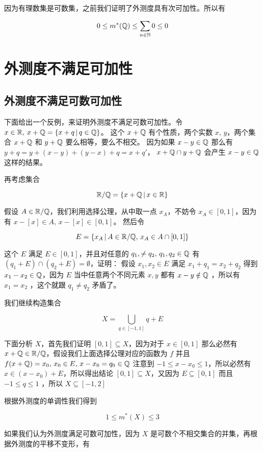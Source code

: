 因为有理数集是可数集，之前我们证明了外测度具有次可加性。所以有

\[
0 \le m^*(\mathbb{Q}) \le \sum_{n \in \mathbb{N}} 0 \le 0
\]

\section{外测度不满足可加性}

\subsection{外测度不满足可数可加性}

下面给出一个反例，来证明外测度不满足可数可加性。令 $x \in \mathbb{R}, \: x + \mathbb{Q} = \{ x + q \,\vert\, q \in \mathbb{Q} \}$。
这个 $x + \mathbb{Q}$ 有个性质，两个实数 $x,\,y$，两个集合 $x + \mathbb{Q}$ 和 $y + \mathbb{Q}$ 要么相等，要么不相交。
因为如果 $x - y \in \mathbb{Q}$ 那么有 $ y + q = y + (x-y) + (y-x) + q = x + q'$， $x + \mathbb{Q} \cap y + \mathbb{Q}$ 会产生 $x -y \in \mathbb{Q}$ 这样的结果。

再考虑集合 

\[
\mathbb{R} / \mathbb{Q} = \{ x + \mathbb{Q} \,\vert\, x \in \mathbb{R} \}
\]

假设 $A \in \mathbb{R}/\mathbb{Q}$，我们利用选择公理，从中取一点 $x_A$，不妨令 $x_A \in [0,1]$，因为有 $x - [x] \in A, \, x - [x] \in [0,1]$。
然后令

\[
 E = \{ x_A \,\vert\, A \in \mathbb{R}/\mathbb{Q}, \, x_A \in A \cap [0,1] \}
\]

这个 $E$ 满足 $E \in [0,1]$，并且对任意的 $q_1, \ne q_2, \, q_1, q_2 \in \mathbb{Q}$ 有 $(q_1 + E) \cap (q_2 + E) = \emptyset$，证明：
假设 $x_1, x_2 \in E$ 满足 $x_1 + q_1 = x_2 + q_2$ 得到 $x_1 - x_2 \in \mathbb{Q}$，因为 $E$ 当中任意两个不同元素 $x,y$ 都有 $x-y \notin \mathbb{Q}$ ，所以有 $x_1 = x_2$ ，这个就跟 $q_1 \ne q_2$ 矛盾了。

我们继续构造集合

\[
X = \bigcup_{q \in [-1,1]} q + E
\]

下面分析 $X$，首先我们证明 $[0,1] \subseteq X$，因为对于 $x \in [0,1]$ 那么必然有 $x + \mathbb{Q} \in \mathbb{R}/\mathbb{Q}$，假设我们上面选择公理对应的函数为 $f$ 并且 $f(x + \mathbb{Q}) = x_0, \, x_0 \in E,\, x - x_0  = q_0 \in \mathbb{Q}$ 
注意到 $-1 \le x - x_0 \le 1$，所以必然有 $x \in (x - x_0) + E$，所以得出结论 $[0,1] \subseteq X$，又因为 $E \subseteq [0,1]$ 而且 $-1 \le q \le 1$ ，所以 $X \subseteq [-1, 2]$

根据外测度的单调性我们得到

\[
1 \le m^*(X) \le 3
\]

如果我们认为外测度满足可数可加性，因为 $X$ 是可数个不相交集合的并集，再根据外测度的平移不变形，有

